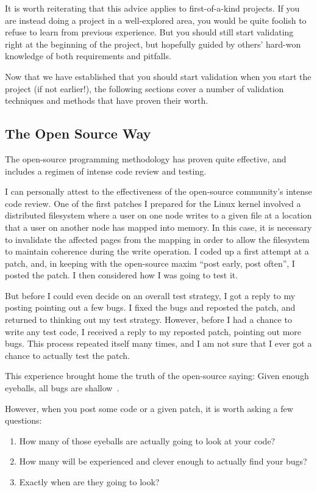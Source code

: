 It is worth reiterating that this advice applies to first-of-a-kind
projects.
If you are instead doing a project in a well-explored area, you would
be quite foolish to refuse to learn from previous experience.
But you should still start validating right at the beginning of the
project, but hopefully guided by others' hard-won knowledge of both
requirements and pitfalls.

Now that we have established that you should start validation when you
start the project (if not earlier!), the following sections cover a
number of validation techniques and methods that have proven their worth.

\subsection{The Open Source Way}
\label{sec:debugging:The Open Source Way}

The open-source programming methodology has proven quite effective, and
includes a regimen of intense code review and testing.

I can personally attest to the effectiveness of the open-source community's
intense code review.
One of the first patches I prepared for the Linux kernel involved
a distributed filesystem where a user on one node writes to a given
file at a location that a user on another node has mapped into memory.
In this case, it is necessary to invalidate the affected pages from
the mapping in order to allow the filesystem to maintain coherence
during the write operation.
I coded up a first attempt at a patch, and, in keeping with the open-source
maxim ``post early, post often'', I posted the patch.
I then considered how I was going to test it.

But before I could even decide on an overall test strategy, I got a
reply to my posting pointing out a few bugs.
I fixed the bugs and reposted the patch, and returned to thinking
out my test strategy.
However, before I had a chance to write any test code, I received
a reply to my reposted patch, pointing out more bugs.
This process repeated itself many times, and I am not sure that I
ever got a chance to actually test the patch.

This experience brought home the truth of the open-source saying:
Given enough eyeballs, all bugs are shallow~\cite{EricSRaymond99b}.

However, when you post some code or a given patch, it is worth
asking a few questions:

\begin{enumerate}
\item	How many of those eyeballs are actually going to look at your code?
\item	How many will be experienced and clever enough to actually find
	your bugs?
\item	Exactly when are they going to look?
\end{enumerate}

